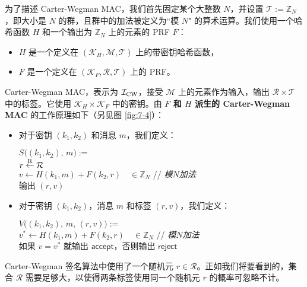 为了描述 Carter-Wegman MAC，我们首先固定某个大整数 $N$，并设置 $\mathcal{T}:=\mathbb{Z}_N$，即大小是 $N$ 的群，且群中的加法被定义为``模 $N$" 的算术运算。我们使用一个哈希函数 $H$ 和一个输出为 $\mathbb{Z}_N$ 上的元素的 PRF $F$：
\begin{itemize}
	\item $H$ 是一个定义在 $(\mathcal{K}_H,\mathcal{M},\mathcal{T})$ 上的带密钥哈希函数，
	\item $F$ 是一个定义在 $(\mathcal{K}_F,\mathcal{R},\mathcal{T})$ 上的 PRF。
\end{itemize}
Carter-Wegman MAC，表示为 $\mathcal{I}_{\rm CW}$，接受 $\mathcal{M}$ 上的元素作为输入，输出 $\mathcal{R}\times\mathcal{T}$ 中的标签。它使用 $\mathcal{K}_H\times\mathcal{K}_F$ 中的密钥。由 \textbf{$F$ 和 $H$ 派生的 Carter-Wegman MAC} 的工作原理如下（另见图 \ref{fig:7-4}）：
\begin{itemize}
	\item 对于密钥 $(k_1,k_2)$ 和消息 $m$，我们定义：
	\vspace{5pt}
	
	\hspace*{5pt} $S\big((k_1,k_2),\,m\big):=$\\
	\hspace*{26pt} $r\overset{\rm R}\leftarrow\mathcal{R}$\\
	\hspace*{26pt} $v\leftarrow H(k_1,m)+F(k_2,r)\quad\in\mathbb{Z}_N$
	\quad\quad// \emph{模}$N$\emph{加法}\\
	\hspace*{26pt} 输出 $(r, v)$
	\item 对于密钥 $(k_1,k_2)$，消息 $m$ 和标签 $(r,v)$，我们定义：
	\vspace{5pt}
	
	\hspace*{5pt} $V\big((k_1,k_2),\,m,\,(r,v)\big):=$\\
	\hspace*{26pt} $v^*\leftarrow H(k_1,m)+F(k_2,r)\quad\in\mathbb{Z}_N$
	\quad\;\;// \emph{模}$N$\emph{加法}\\
	\hspace*{26pt} 如果 $v=v^*$ 就输出 $\mathsf{accept}$，否则输出 $\mathsf{reject}$
\end{itemize}

Carter-Wegman 签名算法中使用了一个随机元 $r\in\mathcal{R}$。正如我们将要看到的，集合 $\mathcal{R}$ 需要足够大，以使得两条标签使用同一个随机元 $r$ 的概率可忽略不计。

